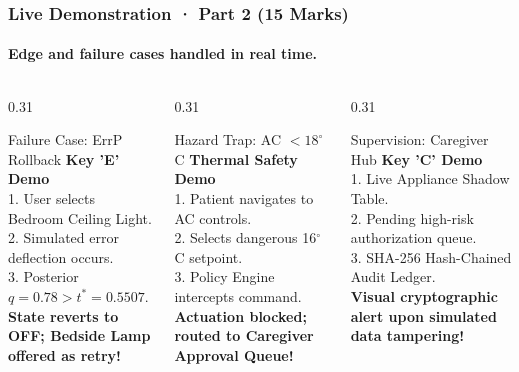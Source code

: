 \documentclass[aspectratio=169,10pt]{beamer}
\begin{document}
\begin{frame}
    \frametitle{Live Demonstration · Part 2 (15 Marks)}
    \framesubtitle{Edge and failure cases handled in real time.}
    \begin{columns}[T]
        \begin{column}{0.31\textwidth}
            \begin{block}{\small Failure Case: ErrP Rollback}
                \scriptsize
                \textbf{Key 'E' Demo}\\
                1. User selects Bedroom Ceiling Light.\\
                2. Simulated error deflection occurs.\\
                3. Posterior $q = 0.78 > t^* = 0.5507$.\\
                \textbf{\color{ForestGreen}State reverts to OFF; Bedside Lamp offered as retry!}
            \end{block}
        \end{column}
        \begin{column}{0.31\textwidth}
            \begin{block}{\small Hazard Trap: AC $< 18^\circ$C}
                \scriptsize
                \textbf{Thermal Safety Demo}\\
                1. Patient navigates to AC controls.\\
                2. Selects dangerous 16$^\circ$C setpoint.\\
                3. Policy Engine intercepts command.\\
                \textbf{\color{AlertGold}Actuation blocked; routed to Caregiver Approval Queue!}
            \end{block}
        \end{column}
        \begin{column}{0.31\textwidth}
            \begin{block}{\small Supervision: Caregiver Hub}
                \scriptsize
                \textbf{Key 'C' Demo}\\
                1. Live Appliance Shadow Table.\\
                2. Pending high-risk authorization queue.\\
                3. SHA-256 Hash-Chained Audit Ledger.\\
                \textbf{\color{ForestGreen}Visual cryptographic alert upon simulated data tampering!}
            \end{block}
        \end{column}
    \end{columns}
\end{frame}
\end{document}

